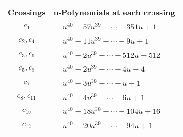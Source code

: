 \documentclass[1p]{elsarticle_modified}
\theoremstyle{definition}
\begin{document}
\begin{tabular}{m{50pt}|m{274pt}}
Crossings & \hspace{64pt}u-Polynomials at each crossing \\
\hline $$\begin{aligned}c_{1}\end{aligned}$$&$\begin{aligned}
&u^{40}+57 u^{39}+\cdots+351 u+1
\end{aligned}$\\
\hline $$\begin{aligned}c_{2},c_{4}\end{aligned}$$&$\begin{aligned}
&u^{40}-11 u^{39}+\cdots+9 u+1
\end{aligned}$\\
\hline $$\begin{aligned}c_{3},c_{6}\end{aligned}$$&$\begin{aligned}
&u^{40}+2 u^{39}+\cdots+512 u-512
\end{aligned}$\\
\hline $$\begin{aligned}c_{5},c_{9}\end{aligned}$$&$\begin{aligned}
&u^{40}-2 u^{39}+\cdots+4 u-4
\end{aligned}$\\
\hline $$\begin{aligned}c_{7}\end{aligned}$$&$\begin{aligned}
&u^{40}-3 u^{39}+\cdots+u-1
\end{aligned}$\\
\hline $$\begin{aligned}c_{8},c_{11}\end{aligned}$$&$\begin{aligned}
&u^{40}+4 u^{39}+\cdots-6 u+1
\end{aligned}$\\
\hline $$\begin{aligned}c_{10}\end{aligned}$$&$\begin{aligned}
&u^{40}+18 u^{39}+\cdots-104 u+16
\end{aligned}$\\
\hline $$\begin{aligned}c_{12}\end{aligned}$$&$\begin{aligned}
&u^{40}-20 u^{39}+\cdots-94 u+1
\end{aligned}$\\
\hline
\end{tabular}\\~\\
\end{document}
